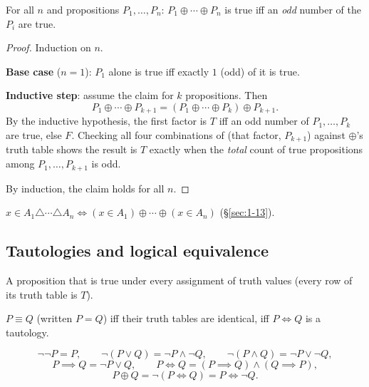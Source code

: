 \bigskip
\begin{theorem}
For all $n$ and propositions $P_1,\dots,P_n$: $P_1\oplus\cdots\oplus P_n$ is true iff an \emph{odd} number of the $P_i$ are true.
\end{theorem}
\begin{proof}
Induction on $n$.

\medskip
\textbf{Base case} ($n=1$): $P_1$ alone is true iff exactly $1$ (odd) of it is true.

\medskip
\textbf{Inductive step}: assume the claim for $k$ propositions. Then
\[
P_1\oplus\cdots\oplus P_{k+1} = (P_1\oplus\cdots\oplus P_k) \oplus P_{k+1}.
\]
By the inductive hypothesis, the first factor is $T$ iff an odd number of $P_1,\dots,P_k$ are true, else $F$. Checking all four combinations of (that factor, $P_{k+1}$) against $\oplus$'s truth table shows the result is $T$ exactly when the \emph{total} count of true propositions among $P_1,\dots,P_{k+1}$ is odd.

\medskip
By induction, the claim holds for all $n$.
\end{proof}

\begin{note}
$x \in A_1 \triangle \cdots \triangle A_n \iff (x\in A_1)\oplus\cdots\oplus(x\in A_n)$ (\S\ref{sec:1-13}).
\end{note}

\subsection{Tautologies and logical equivalence}
\label{sec:4-12}

\begin{definition}[Tautology]
A proposition that is true under every assignment of truth values (every row of its truth table is $T$).
\end{definition}

\begin{definition}
$P \equiv Q$ (written $P=Q$) iff their truth tables are identical, iff $P\iff Q$ is a tautology.
\end{definition}

\begin{note}
\[
\neg\neg P = P, \qquad \neg(P\vee Q)=\neg P\wedge\neg Q, \qquad \neg(P\wedge Q)=\neg P\vee\neg Q,
\]
\[
P\implies Q = \neg P \vee Q, \qquad P\iff Q = (P\implies Q)\wedge(Q\implies P),
\]
\[
P\oplus Q = \neg(P\iff Q) = P \iff \neg Q.
\]
\end{note}

